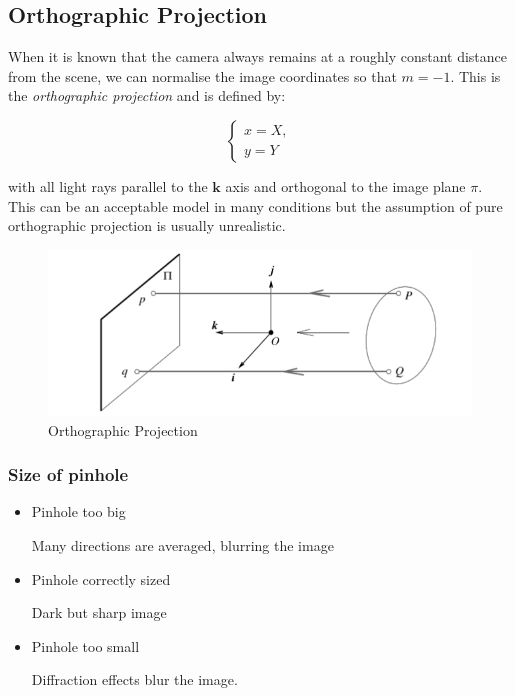 \documentclass{article}
\begin{document}
\subsection{Orthographic Projection}

When it is known that the camera always remains at a roughly constant distance from the scene, we can normalise the image coordinates so that $m=-1$. This is the \textit{orthographic projection} and is defined by:

\[
  \begin{cases}
    x = X, \\
    y = Y
  \end{cases}
\]

with all light rays parallel to the $\mathbf{k} $ axis and orthogonal to the image plane $\pi$. This can be an acceptable model in many conditions but the assumption of pure orthographic projection is usually unrealistic.

\begin{figure}[ht]
  \centering
  \includegraphics[scale=0.6]{figures/orthperspective.png}
  \caption{\label{fig:orthperspective} Orthographic Projection}
\end{figure}

\subsubsection{Size of pinhole}

\begin{itemize}
  \item Pinhole too big

        Many directions are averaged, blurring the image

  \item Pinhole correctly sized

        Dark but sharp image

  \item Pinhole too small

        Diffraction effects blur the image.
\end{itemize}
\end{document}

